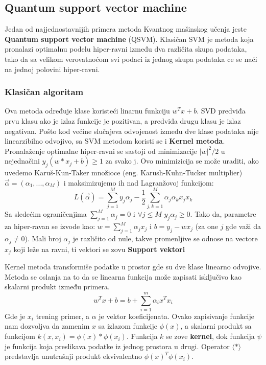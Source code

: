 \documentclass[12pt, letterpaper, oneside]{article}
\begin{document}
\subsection{Quantum support vector machine}
Jedan od najjednostavnijih primera metoda Kvantnog mašinskog učenja jeste \textbf{Quantum support vector machine} (QSVM). Klasičan SVM je metoda koja pronalazi optimalnu podelu hiper-ravni
između dva različita skupa podataka, tako da sa velikom verovatnoćom svi podaci iz jednog skupa podataka ce se naći na jednoj polovini hiper-ravni. \cite{Quantum_machine_learning}
\subsubsection{Klasičan algoritam}
Ova metoda određuje klase koristeći linarnu funkciju $w^{T}x + b$. SVD predviđa prvu klasu ako je izlaz funkcije je pozitivan, a predviđa drugu klasu je izlaz negativan.
Pošto kod većine slučajeva odvojenost između dve klase podataka nije linearzibilno odvojivo, sa SVM metodom koristi se i \textbf{Kernel metoda}. \\
Pronalaženje optimalne hiper-ravni se sastoji od minimizacije $|w|^{2}/2$ u nejednačini $y_j(w*x_j+b) \geq 1$ za svako j. 
Ovo minimizicija se može uraditi, ako uvedemo Karuš-Kun-Taker množioce (eng. Karush-Kuhn-Tucker multiplier) $\overrightarrow{\alpha} = (\alpha_1,...,\alpha_M)$ i maksimizujemo ih nad Lagranžovoj funkcijom:
\[
    L(\overrightarrow{\alpha}) = \sum_{j=1}^{M}{y_j\alpha_j} - \frac{1}{2}\sum_{j,k=1}^{M}{\alpha_j\alpha_kx_jx_k}
\]
Sa sledećim ograničenjima $\sum_{j=1}^{M}{\alpha_j=0}$ i $\forall j \leq M $ $y_j\alpha_j \geq 0$. Tako da, parametre za hiper-ravan se izvode kao:
$w = \sum_{j=1}^{M}\alpha_jx_j$ i $b = y_j - wx_j$ (za one $j$ gde važi da $\alpha_j \neq 0$). Mali broj $\alpha_j$ je različito od nule, takve promenljive se odnose na vectore $x_j$ koji leže na ravni,
ti vektori se zovu \textbf{Support vektori} \cite{rebentrost2014quantum}

Kernel metoda transformiše podatke u prostor gde su dve klase linearno odvojive. Metoda se oslanja na to da se linearna funkcija
može zapisati isključivo kao skalarni produkt između primera.
\[
    w^{T}x + b = b + \sum_{i=1}^m \alpha_ix^Tx_i
\]
Gde je $x_i$ trening primer, a $\alpha$ je vektor koeficijenata. Ovako zapisivanje funkcije nam dozvoljva da zamenim $x$ sa izlazom funkcije $\phi(x)$, a skalarni produkt sa funkcijom $k(x,x_i) = \phi(x)*\phi(x_i)$.
Funkcija $k$ se zove \textbf{kernel}, dok funkcija $\psi$ je funkcija koja preslikava podatke iz jednog prostora u drugi. Operator $\langle * \rangle$ predstavlja unutrašnji produkt ekvivalentno $\phi(x)^T\phi(x_i)$. \cite{goodfellow2016deep}
\end{document}
